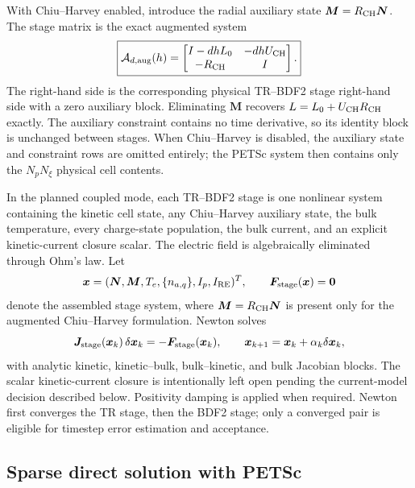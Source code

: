 \documentclass[11pt]{article}
\begin{document}
With Chiu--Harvey enabled, introduce the radial auxiliary state
$\bm M=R_{\rm CH}\bm N$.  The stage matrix is the exact augmented system
\begin{equation}
 \boxed{
 \mathcal A_{d,\rm aug}(h)=
 \begin{bmatrix}
  I-dhL_0 & -dhU_{\rm CH}\\
  -R_{\rm CH} & I
 \end{bmatrix}.
 }
 \label{eq:trbdf2_augmented_matrix}
\end{equation}
The right-hand side is the corresponding physical TR--BDF2 stage right-hand side
with a zero auxiliary block.  Eliminating $\bm M$ recovers
$L=L_0+U_{\rm CH}R_{\rm CH}$ exactly.  The auxiliary constraint contains no time
derivative, so its identity block is unchanged between stages.
When Chiu--Harvey is disabled, the auxiliary state and constraint rows are omitted
entirely; the PETSc system then contains only the $N_pN_\xi$ physical cell contents.

In the planned coupled mode, each TR--BDF2 stage is one nonlinear system containing the kinetic
cell state, any Chiu--Harvey auxiliary state, the bulk temperature, every charge-state
population, the bulk current, and an explicit kinetic-current closure scalar.  The
electric field is algebraically eliminated through Ohm's law.  Let
\begin{equation}
 \bm x=(\bm N,\bm M,T_e,\{n_{a,q}\},I_p,I_{\rm RE})^T,
 \qquad
 \bm F_{\rm stage}(\bm x)=\bm 0
 \label{eq:coupled_stage_system}
\end{equation}
denote the assembled stage system, where $\bm M=R_{\rm CH}\bm N$ is present only
for the augmented Chiu--Harvey formulation.  Newton solves
\begin{equation}
 \bm J_{\rm stage}(\bm x_k)\,\delta\bm x_k
 =-\bm F_{\rm stage}(\bm x_k),\qquad
 \bm x_{k+1}=\bm x_k+\alpha_k\delta\bm x_k,
 \label{eq:coupled_newton_step}
\end{equation}
with analytic kinetic, kinetic--bulk, bulk--kinetic, and bulk Jacobian blocks.
The scalar kinetic-current closure is intentionally left open pending the current-model
decision described below.  Positivity damping is applied when required.  Newton first
converges the TR stage, then the BDF2
stage; only a converged pair is eligible for timestep error estimation and
acceptance.

\subsection{Sparse direct solution with PETSc}
\end{document}

